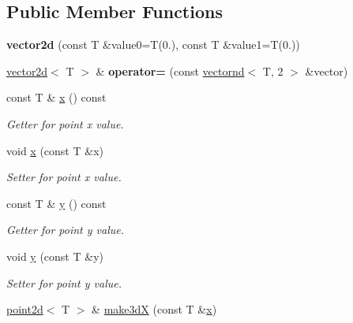 \subsection*{Public Member Functions}
\begin{DoxyCompactItemize}
\item 
\mbox{\label{classacme_1_1vector2d_a830f86da17bb90b237e007f3ea6abb55}} 
{\bfseries vector2d} (const T \&value0=T(0.), const T \&value1=T(0.))
\item 
\mbox{\label{classacme_1_1vector2d_a316b2f73402d2cc96e3d676dab097add}} 
\hyperlink{classacme_1_1vector2d}{vector2d}$<$ T $>$ \& {\bfseries operator=} (const \hyperlink{classacme_1_1vectornd}{vectornd}$<$ T, 2 $>$ \&vector)
\item 
\mbox{\label{classacme_1_1point2d_aa62c36149dc319bcd38b351be5230f04}} 
const T \& \hyperlink{classacme_1_1point2d_aa62c36149dc319bcd38b351be5230f04}{x} () const
\begin{DoxyCompactList}\small\item\em Getter for point x value. \end{DoxyCompactList}\item 
void \hyperlink{classacme_1_1point2d_a158797a6603451c35bd0e2be3be3b2c8}{x} (const T \&x)
\begin{DoxyCompactList}\small\item\em Setter for point x value. \end{DoxyCompactList}\item 
\mbox{\label{classacme_1_1point2d_adf79b9f2fbcac2c5f1bea2bece0e9b27}} 
const T \& \hyperlink{classacme_1_1point2d_adf79b9f2fbcac2c5f1bea2bece0e9b27}{y} () const
\begin{DoxyCompactList}\small\item\em Getter for point y value. \end{DoxyCompactList}\item 
void \hyperlink{classacme_1_1point2d_ab1baab0e82e178f1e828a25fa8dbb1c8}{y} (const T \&y)
\begin{DoxyCompactList}\small\item\em Setter for point y value. \end{DoxyCompactList}\item 
\hyperlink{classacme_1_1point2d}{point2d}$<$ T $>$ \& \hyperlink{classacme_1_1point2d_a23948fcd0635557e8eeb0c298bb96f68}{make3dX} (const T \&\hyperlink{classacme_1_1point2d_aa62c36149dc319bcd38b351be5230f04}{x})

\end{DoxyCompactItemize}
